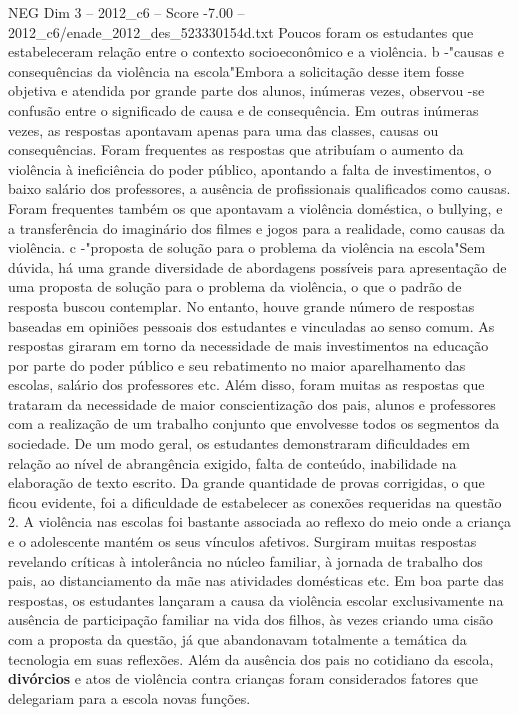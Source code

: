 \begin{textsample}{NEG Dim 3 – 2012\_c6 – Score -7.00 – 2012\_c6/enade\_2012\_des\_523330154d.txt}
Poucos foram os estudantes que estabeleceram relação entre o contexto socioeconômico e a violência. b -"causas e consequências da violência na escola"Embora a solicitação desse item fosse objetiva e atendida por grande parte dos alunos, inúmeras vezes, observou -se confusão entre o significado de causa e de consequência.
Em outras inúmeras vezes, as respostas apontavam apenas para uma das classes, causas ou consequências.
Foram frequentes as respostas que atribuíam o aumento da violência à ineficiência do poder público, apontando a falta de investimentos, o baixo salário dos professores, a ausência de profissionais qualificados como causas.
Foram frequentes também os que apontavam a violência doméstica, o bullying, e a transferência do imaginário dos filmes e jogos para a realidade, como causas da violência. c -"proposta de solução para o problema da violência na escola"Sem dúvida, há uma grande diversidade de abordagens possíveis para apresentação de uma proposta de solução para o problema da violência, o que o padrão de resposta buscou contemplar.
No entanto, houve grande número de respostas baseadas em opiniões pessoais dos estudantes e vinculadas ao senso comum.
As respostas giraram em torno da necessidade de mais investimentos na educação por parte do poder público e seu rebatimento no maior aparelhamento das escolas, salário dos professores etc.
Além disso, foram muitas as respostas que trataram da necessidade de maior conscientização dos pais, alunos e professores com a realização de um trabalho conjunto que envolvesse todos os segmentos da sociedade.
De um modo geral, os estudantes demonstraram dificuldades em relação ao nível de abrangência exigido, falta de conteúdo, inabilidade na elaboração de texto escrito.
Da grande quantidade de provas corrigidas, o que ficou evidente, foi a dificuldade de estabelecer as conexões requeridas na questão 2.
A violência nas escolas foi bastante associada ao reflexo do meio onde a criança e o adolescente mantém os seus vínculos afetivos.
Surgiram muitas respostas revelando críticas à intolerância no núcleo familiar, à jornada de trabalho dos pais, ao distanciamento da mãe nas atividades domésticas etc.
Em boa parte das respostas, os estudantes lançaram a causa da violência escolar exclusivamente na ausência de participação familiar na vida dos filhos, às vezes criando uma cisão com a proposta da questão, já que abandonavam totalmente a temática da tecnologia em suas reflexões.
Além da ausência dos pais no cotidiano da escola, \textbf{divórcios} e atos de violência contra crianças foram considerados fatores que delegariam para a escola novas funções.

\end{textsample}
